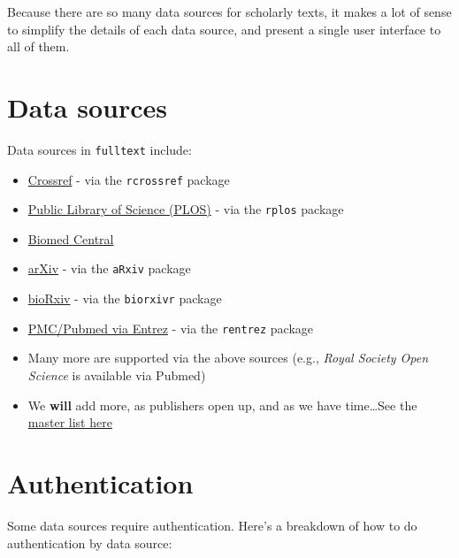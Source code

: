 \documentclass[]{book}
\providecommand{\tightlist}{%
  \setlength{\itemsep}{0pt}\setlength{\parskip}{0pt}}
\theoremstyle{definition}
\theoremstyle{definition}
\theoremstyle{definition}
\theoremstyle{remark}
\begin{document}
Because there are so many data sources for scholarly texts, it makes a
lot of sense to simplify the details of each data source, and present a
single user interface to all of them.

\hypertarget{data-sources}{%
\chapter{Data sources}\label{data-sources}}

Data sources in \texttt{fulltext} include:

\begin{itemize}
\tightlist
\item
  \href{http://www.crossref.org/}{Crossref} - via the \texttt{rcrossref}
  package
\item
  \href{https://www.plos.org/}{Public Library of Science (PLOS)} - via
  the \texttt{rplos} package
\item
  \href{http://www.biomedcentral.com/}{Biomed Central}
\item
  \href{https://arxiv.org}{arXiv} - via the \texttt{aRxiv} package
\item
  \href{http://biorxiv.org/}{bioRxiv} - via the \texttt{biorxivr}
  package
\item
  \href{http://www.ncbi.nlm.nih.gov/}{PMC/Pubmed via Entrez} - via the
  \texttt{rentrez} package
\item
  Many more are supported via the above sources (e.g., \emph{Royal
  Society Open Science} is available via Pubmed)
\item
  We \textbf{will} add more, as publishers open up, and as we have
  time\ldots{}See the
  \href{https://github.com/ropensci/fulltext/issues/4\#issuecomment-52376743}{master
  list here}
\end{itemize}

\hypertarget{authentication}{%
\chapter{Authentication}\label{authentication}}

Some data sources require authentication. Here's a breakdown of how to
do authentication by data source:
\end{document}
